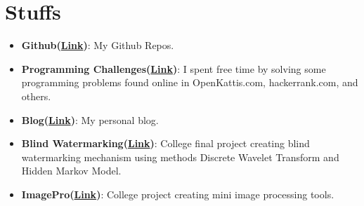 \documentclass[letterpaper,11pt]{article}
\newcommand{\resumeItem}[2]{
  \item\small{
    \textbf{#1}{: #2 \vspace{-2pt}}
  }
}
\newcommand{\resumeSubItem}[2]{\resumeItem{#1}{#2}\vspace{-4pt}}
\newcommand{\resumeSubHeadingListStart}{\begin{itemize}[leftmargin=*]}
\newcommand{\resumeSubHeadingListEnd}{\end{itemize}}
\begin{document}
\section{Stuffs}
  \resumeSubHeadingListStart
    \resumeSubItem{Github(\href{https://github.com/mfathirirhas}{Link})}
      {My Github Repos.}
    \resumeSubItem{Programming Challenges(\href{https://github.com/mfathirirhas/ProgrammingChallenges}{Link})}
      {I spent free time by solving some programming problems found online in OpenKattis.com, hackerrank.com, and others.}
    \resumeSubItem{Blog(\href{https://mfathirirhas.github.io}{Link})}
      {My personal blog.}
    \resumeSubItem{Blind Watermarking(\href{https://github.com/mfathirirhas/TugasAkhir1}{Link})}
      {College final project creating blind watermarking mechanism using methods Discrete Wavelet Transform and Hidden Markov Model.}
    \resumeSubItem{ImagePro(\href{https://github.com/mfathirirhas/ImagePro}{Link})}
      {College project creating mini image processing tools.}
  \resumeSubHeadingListEnd


\end{document}
